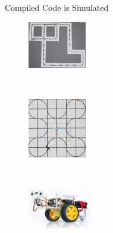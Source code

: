 \documentclass[slidestop,aspectratio=169]{beamer}
\theoremstyle{plain}
\theoremstyle{definition}
\theoremstyle{remark}
\begin{document}
\begin{frame}[t]{Compiled Code is Simulated}
\begin{figure}[tb]
\begin{minipage}[b]{1in}
\includegraphics[width=1in]{graphics/screen2.png}%
\end{minipage}\ \ %
\begin{minipage}[b]{1in}\centering%
\includegraphics[width=1in]{graphics/screen3.png}%
\end{minipage}\ \ %
\begin{minipage}[b]{1.1in}\centering%
\includegraphics[width=1.1in,clip,trim=0 0 0 75]{img/gopigo3.jpg}%
\end{minipage}
\label{fig:patrol-plan}
\end{figure}
\end{frame}
\end{document}
